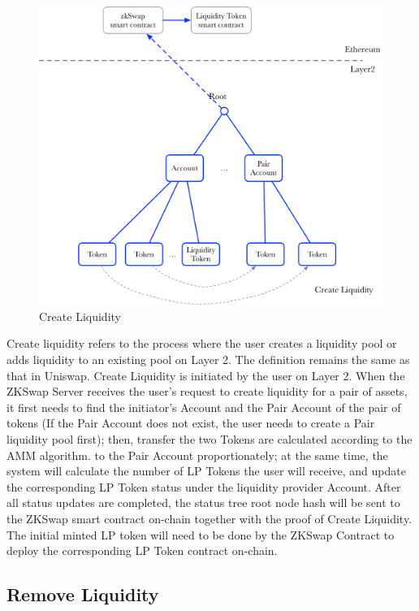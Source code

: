 \documentclass[]{template/llncs}
\begin{document}
\begin{figure}[htbp]
\centering
\includegraphics[width=0.9\columnwidth]{figure/create_liquidity}
\caption{Create Liquidity}
\label{fig:create_liquidity}
\end{figure}

Create liquidity refers to the process where the user creates a liquidity pool or adds liquidity to an existing pool on Layer 2. The definition remains the same as that in Uniswap. 
Create Liquidity is initiated by the user on Layer 2. When the ZKSwap Server receives the user’s request to create liquidity for a pair of assets, it first needs to find the initiator’s Account and the Pair Account of the pair of tokens (If the Pair Account does not exist, the user needs to create a Pair liquidity pool first);  then, transfer the two Tokens are calculated according to the AMM algorithm.
to the Pair Account proportionately; at the same time, the system will calculate the number of LP Tokens the user will receive, and update the corresponding LP Token status under the liquidity provider Account. After all status updates are completed, the status tree root node hash will be sent to the ZKSwap smart contract on-chain together with the proof of Create Liquidity. The initial minted LP token will need to be done by the ZKSwap Contract to deploy the corresponding LP Token contract on-chain.


\subsection{Remove Liquidity }
\end{document}
